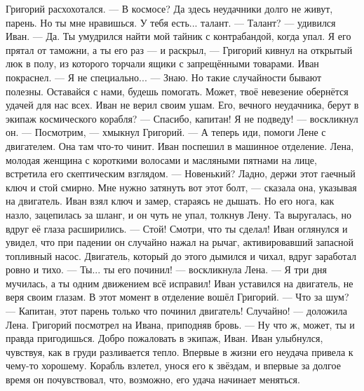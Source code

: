 \documentclass[12pt,a4paper]{book}
\begin{document}
Григорий расхохотался.
— В космосе? Да здесь неудачники долго не живут, парень. Но ты мне нравишься. У тебя есть... талант.
— Талант? — удивился Иван.
— Да. Ты умудрился найти мой тайник с контрабандой, когда упал. Я его прятал от таможни, а ты его раз — и раскрыл, — Григорий кивнул на открытый люк в полу, из которого торчали ящики с запрещёнными товарами.
Иван покраснел.
— Я не специально...
— Знаю. Но такие случайности бывают полезны. Оставайся с нами, будешь помогать. Может, твоё невезение обернётся удачей для нас всех.
Иван не верил своим ушам. Его, вечного неудачника, берут в экипаж космического корабля?
— Спасибо, капитан! Я не подведу! — воскликнул он.
— Посмотрим, — хмыкнул Григорий. — А теперь иди, помоги Лене с двигателем. Она там что-то чинит.
Иван поспешил в машинное отделение. Лена, молодая женщина с короткими волосами и масляными пятнами на лице, встретила его скептическим взглядом.
— Новенький? Ладно, держи этот гаечный ключ и стой смирно. Мне нужно затянуть вот этот болт, — сказала она, указывая на двигатель.
Иван взял ключ и замер, стараясь не дышать. Но его нога, как назло, зацепилась за шланг, и он чуть не упал, толкнув Лену. Та выругалась, но вдруг её глаза расширились.
— Стой! Смотри, что ты сделал!
Иван оглянулся и увидел, что при падении он случайно нажал на рычаг, активировавший запасной топливный насос. Двигатель, который до этого дымился и чихал, вдруг заработал ровно и тихо.
— Ты... ты его починил! — воскликнула Лена. — Я три дня мучилась, а ты одним движением всё исправил!
Иван уставился на двигатель, не веря своим глазам. В этот момент в отделение вошёл Григорий.
— Что за шум?
— Капитан, этот парень только что починил двигатель! Случайно! — доложила Лена.
Григорий посмотрел на Ивана, приподняв бровь.
— Ну что ж, может, ты и правда пригодишься. Добро пожаловать в экипаж, Иван.
Иван улыбнулся, чувствуя, как в груди разливается тепло. Впервые в жизни его неудача привела к чему-то хорошему. Корабль взлетел, унося его к звёздам, и впервые за долгое время он почувствовал, что, возможно, его удача начинает меняться.
\end{document}
